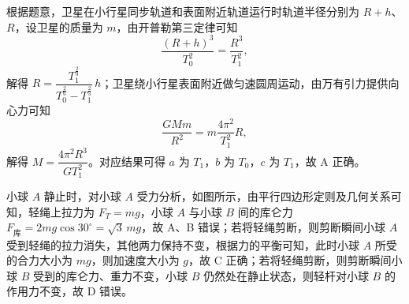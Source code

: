\begin{answer}
根据题意，卫星在小行星同步轨道和表面附近轨道运行时轨道半径分别为 $R+h$、$R$，设卫星的质量为 $m$，由开普勒第三定律可知
\[
  \frac{(R+h)^{3}}{T_{0}^{2}}=\frac{R^{3}}{T_{1}^{2}},
\]
解得 $R=\dfrac{T_{1}^{\frac{2}{3}}}{T_{0}^{\frac{2}{3}}-T_{1}^{\frac{2}{3}}}\,h$；卫星绕小行星表面附近做匀速圆周运动，由万有引力提供向心力可知
\[
  \frac{GMm}{R^{2}}=m\frac{4\pi^{2}}{T_{1}^{2}}R,
\]
解得 $M=\dfrac{4\pi^{2}R^{3}}{GT_{1}^{2}}$。对应结果可得 $a$ 为 $T_{1}$，$b$ 为 $T_{0}$，$c$ 为 $T_{1}$，故 A 正确。
\end{answer}

\begin{answer}
小球 $A$ 静止时，对小球 $A$ 受力分析，如图所示，由平行四边形定则及几何关系可知，轻绳上拉力为 $F_{T}=mg$，小球 $A$ 与小球 $B$ 间的库仑力 $F_{\text{库}}=2mg\cos30^{\circ}=\sqrt{3}\,mg$，故 A、B 错误；若将轻绳剪断，则剪断瞬间小球 $A$ 受到轻绳的拉力消失，其他两力保持不变，根据力的平衡可知，此时小球 $A$ 所受的合力大小为 $mg$，则加速度大小为 $g$，故 C 正确；若将轻绳剪断，则剪断瞬间小球 $B$ 受到的库仑力、重力不变，小球 $B$ 仍然处在静止状态，则轻杆对小球 $B$ 的作用力不变，故 D 错误。

\end{answer}

